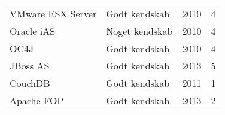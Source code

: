 \documentclass[a4paper,11pt]{article}
\begin{document}
\begin{tabularx}{\textwidth}{X l r r}
  VMware ESX Server                 & Godt kendskab   & 2010                 &      4 \\
  Oracle iAS                        & Noget kendskab  & 2010                 &      4 \\
  OC4J                              & Godt kendskab   & 2010                 &      4 \\
  JBoss AS                          & Godt kendskab   & 2013                 &      5 \\
  CouchDB                           & Godt kendskab   & 2011                 &      1 \\
  Apache FOP                        & Godt kendskab   & 2013                 &      2 \\
  \hline
\end{tabularx}
\end{document}
